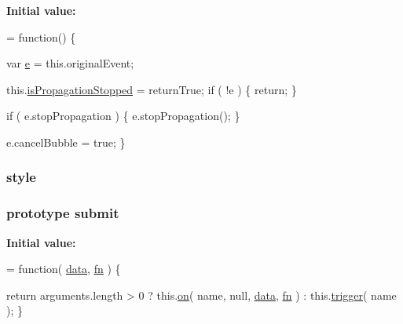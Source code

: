 {\bfseries Initial value\-:}
\begin{DoxyCode}
= \textcolor{keyword}{function}() \{


        var \hyperlink{jquery-1_810_82_8min_8js_a2c038346d47955cbe2cb91e338edd7e1}{e} = this.originalEvent;

        this.\hyperlink{jquery-1_810_82-vsdoc_8js_a67f2430529d27bb55dbfa279dc2899ea}{isPropagationStopped} = returnTrue;
        \textcolor{keywordflow}{if} ( !e ) \{
            \textcolor{keywordflow}{return};
        \}
        
        \textcolor{keywordflow}{if} ( e.stopPropagation ) \{
            e.stopPropagation();
        \}

        
        
        e.cancelBubble = \textcolor{keyword}{true};
    \}
\end{DoxyCode}
\hypertarget{jquery-1_810_82-vsdoc_8js_af3f76f18e38dd06c0a345ede43abb420}{
\subsubsection[{style}]{ style}}\label{jquery-1_810_82-vsdoc_8js_af3f76f18e38dd06c0a345ede43abb420}
\hypertarget{jquery-1_810_82-vsdoc_8js_a58af54f4f7137a051db7e3e27bdfe1b5}{
\subsubsection[{submit}]{ {\bf prototype} submit}}\label{jquery-1_810_82-vsdoc_8js_a58af54f4f7137a051db7e3e27bdfe1b5}
{\bfseries Initial value\-:}
\begin{DoxyCode}
= \textcolor{keyword}{function}( \hyperlink{jquery-1_810_82-vsdoc_8js_a609407b3456fdc3c5671a9fc4a226ff7}{data}, \hyperlink{jquery-1_810_82-vsdoc_8js_acef6bdaf6b9b20fdcca1ea86f0902c3b}{fn} ) \{


        \textcolor{keywordflow}{return} arguments.length > 0 ?
            this.\hyperlink{jquery-1_810_82-vsdoc_8js_ae453b412b883f60220d73468ef6c6dbc}{on}( name, null, \hyperlink{jquery-1_810_82-vsdoc_8js_a609407b3456fdc3c5671a9fc4a226ff7}{data}, \hyperlink{jquery-1_810_82-vsdoc_8js_acef6bdaf6b9b20fdcca1ea86f0902c3b}{fn} ) :
            this.\hyperlink{jquery-1_810_82-vsdoc_8js_a2388c4114d5e3e4eab020f973641519c}{trigger}( name );
    \}
\end{DoxyCode}
